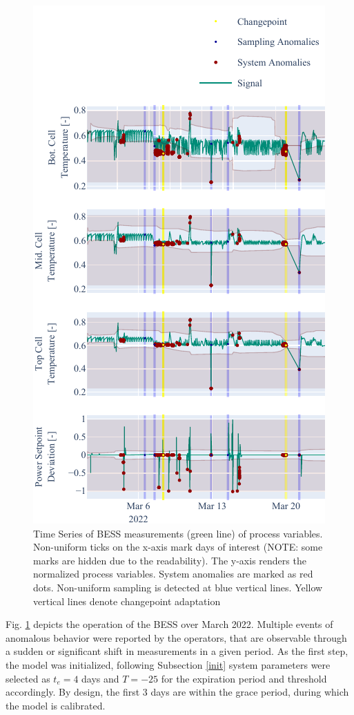 \begin{figure}[htbp]
\centerline{\includegraphics{figures/system_thresh.pdf}}
\caption{Time Series of BESS measurements (green line) of process variables. Non-uniform ticks on the x-axis mark days of interest (NOTE: some marks are hidden due to the readability). The y-axis renders the normalized process variables. System anomalies are marked as red dots. Non-uniform sampling is detected at blue vertical lines. Yellow vertical lines denote changepoint adaptation}
\label{fig:process}
\end{figure}

Fig. \ref{fig:process} depicts the operation of the BESS over March 2022. Multiple events of anomalous behavior were reported by the operators, that are observable through a sudden or significant shift in measurements in a given period. As the first step, the model was initialized, following Subsection \ref{init} system parameters were selected as $t_e = 4$ days and $T = -25$ for the expiration period and threshold accordingly. By design, the first 3 days are within the grace period, during which the model is calibrated.

